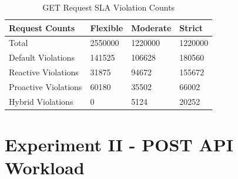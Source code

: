 \begin{table}
    \caption{GET Request SLA Violation Counts}\label{tab:exp1-sla-violation-count}
    \centering
    \begin{tabular}{|l|l|l|l|}
        \hline
        Request Counts & Flexible & Moderate & Strict \\
        \hline
        Total  & \num[group-separator={,}]{2550000} & \num[group-separator={,}]{1220000} & \num[group-separator={,}]{1220000} \\
        Default Violations & \num[group-separator={,}]{141525} & \num[group-separator={,}]{106628} & \num[group-separator={,}]{180560} \\
        Reactive Violations & \num[group-separator={,}]{31875} & \num[group-separator={,}]{94672} & \num[group-separator={,}]{155672} \\
        Proactive Violations & \num[group-separator={,}]{60180} & \num[group-separator={,}]{35502} & \num[group-separator={,}]{66002} \\
        Hybrid Violations & \num[group-separator={,}]{0} & \num[group-separator={,}]{5124} & \num[group-separator={,}]{20252} \\
         \hline
    \end{tabular}
\end{table}

\section{Experiment II - POST API Workload}
\label{sec:ch5-exp2-post-api}


